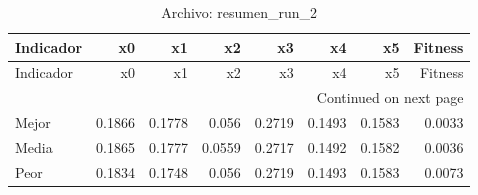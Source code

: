 \begin{longtable}{lrrrrrrr}
\caption{Archivo: resumen\_run\_2}\label{tab:resumen_run_2} \\
\toprule
Indicador & x0 & x1 & x2 & x3 & x4 & x5 & Fitness \\
\midrule
\endfirsthead
\toprule
Indicador & x0 & x1 & x2 & x3 & x4 & x5 & Fitness \\
\midrule
\endhead
\midrule
\multicolumn{8}{r}{Continued on next page} \\
\midrule
\endfoot
\bottomrule
\endlastfoot
Mejor & 0.1866 & 0.1778 & 0.056 & 0.2719 & 0.1493 & 0.1583 & 0.0033 \\
Media & 0.1865 & 0.1777 & 0.0559 & 0.2717 & 0.1492 & 0.1582 & 0.0036 \\
Peor & 0.1834 & 0.1748 & 0.056 & 0.2719 & 0.1493 & 0.1583 & 0.0073 \\
\end{longtable}